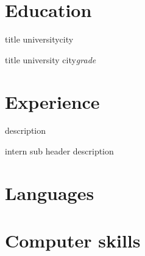 \documentclass[11pt,a4paper]{moderncv}
\begin{document}
\maketitle

\section{Education}
        {title}
        {university}{city}{}{}  %

        {title}
        {university}
        {city}{\textit{grade}}{}


\section{Experience}
{}{}
{ {}
description
}

{}{}
{intern sub header \newline{}
description
}

\section{Languages}

\section{Computer skills}


\end{document}
